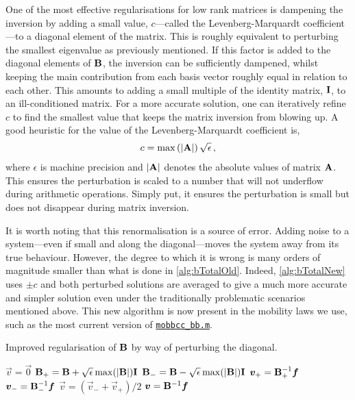 One of the most effective regularisations for low rank matrices is dampening the inversion by adding a small value, $c$---called the Levenberg-Marquardt coefficient---to a diagonal element of the matrix. This is roughly equivalent to perturbing the smallest eigenvalue as previously mentioned. If this factor is added to the diagonal elements of $\mathbf{B}$, the inversion can be sufficiently dampened, whilst keeping the main contribution from each basis vector roughly equal in relation to each other. This amounts to adding a small multiple of the identity matrix, $\mathbf{I}$, to an ill-conditioned matrix. For a more accurate solution, one can iteratively refine $c$ to find the smallest value that keeps the matrix inversion from blowing up. A good heuristic for the value of the Levenberg-Marquardt coefficient is,
\begin{align}\label{eq:marquardt}
    c = \max\left(\lvert\mathbf{A}\rvert\right) \sqrt{\epsilon}\,,
\end{align}
where $\epsilon$ is machine precision and $\lvert \mathbf{A}\rvert$ denotes the absolute values of matrix $\mathbf{A}$. This ensures the perturbation is scaled to a number that will not underflow during arithmetic operations. Simply put, it ensures the perturbation is small but does not disappear during matrix inversion.

It is worth noting that this renormalisation is a source of error. Adding noise to a system---even if small and along the diagonal---moves the system away from its true behaviour. However, the degree to which it is wrong is many orders of magnitude smaller than what is done in \cref{alg:bTotalOld}. Indeed, \cref{alg:bTotalNew} uses $\pm c $ and both perturbed solutions are averaged to give a much more accurate and simpler solution even under the traditionally problematic scenarios mentioned above. This new algorithm is now present in the mobility laws we use, such as the most current version of \href{https://github.com/TarletonGroup/EasyDD/blob/372984499dd60136fc7badabd6cee192058d55d9/src/mobbcc_bb1b.m#L199}{\texttt{mobbcc\_bb.m}}.
\begin{algorithm}
    \caption[Dampening the drag matrix inversion singularity.]{Improved regularisation of $\mathbf{B}$ by way of perturbing the diagonal.}
    \label{alg:bTotalNew}
    \begin{algorithmic}
        \State $\vec{v} = \vec{0}$
        \State $\mathbf{B}_+ = \mathbf{B} + \sqrt{\epsilon} \max(\mathbf{\lvert B\rvert}) \mathbf{I}$
        \State $\mathbf{B}_- = \mathbf{B} - \sqrt{\epsilon} \max(\mathbf{\lvert B\rvert}) \mathbf{I}$
        \State $\vec{v}_+ = \mtx{B}_+^{-1} \vec{f}$
        \State $\vec{v}_- = \mtx{B}_-^{-1} \vec{f}$
        \State $\vec{v} = (\vec{v}_- + \vec{v}_+)/2$
        \Else
        \State $\vec{v} = \mtx{B}^{-1} \vec{f}$
        \EndIf
    \end{algorithmic}
\end{algorithm}

